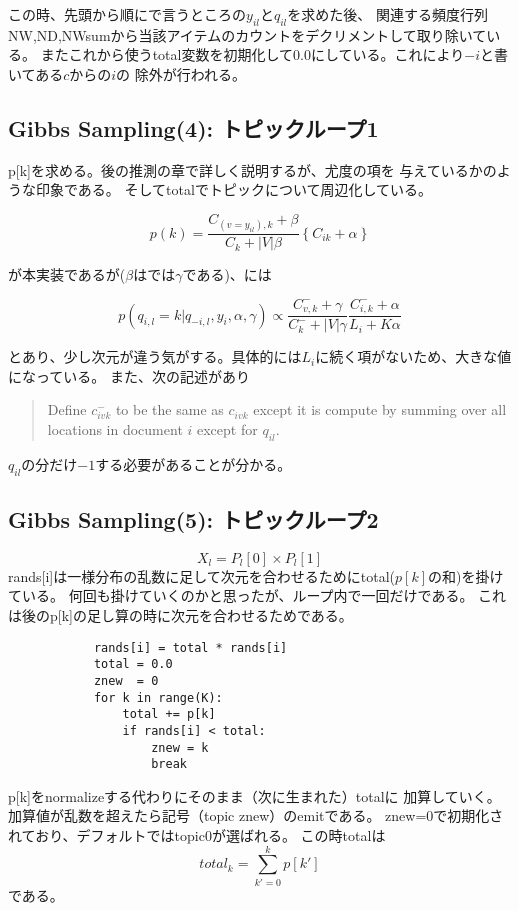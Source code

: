 \documentclass[uplatex]{jsarticle}
\begin{document}
この時、先頭から順に\cite{murphy}で言うところの$y_{il}$と$q_{il}$を求めた後、
関連する頻度行列NW,ND,NWsumから当該アイテムのカウントをデクリメントして取り除いている。
またこれから使うtotal変数を初期化して0.0にしている。これにより$-i$と書いてある$c$からの$i$の
除外が行われる。

\subsection{Gibbs Sampling(4): トピックループ1}
p[k]を求める。後の推測の章で詳しく説明するが、尤度の項を
与えているかのような印象である。
そしてtotalでトピックについて周辺化している。

\begin{equation}
p(k) = \frac{C_{(v=y_{il}),k} + \beta}{C_{k} + |V|\beta} \left\{C_{ik} + \alpha\right\}
\end{equation}

が本実装であるが($\beta$は\cite{murphy}では$\gamma$である)、\cite{murphy}には

\begin{equation}
p(q_{i,l} = k|q_{−i,l}, y_i, \alpha, \gamma) ∝ \frac{C_{v,k}^{-} + \gamma}{C_{k}^{-} + |V|\gamma} \frac{C_{i,k}^{-} + \alpha}{L_i + K\alpha}
\end{equation}

とあり、少し次元が違う気がする。具体的には$L_i$に続く項がないため、大きな値になっている。
また、次の記述があり

\begin{quote}
Define $c^{−}_{ivk}$ to be the same as $c_{ivk}$ except it is compute by summing over all locations in document $i$ except for $q_{il}$.\cite{murphy}
\end{quote}

$q_{il}$の分だけ$-1$する必要があることが分かる。 

\subsection{Gibbs Sampling(5): トピックループ2}
\begin{equation}
X_l = P_l[0] \times P_l[1]
\end{equation}
rands[i]は一様分布の乱数に足して次元を合わせるためにtotal($p[k]$の和)を掛けている。
何回も掛けていくのかと思ったが、ループ内で一回だけである。
これは後のp[k]の足し算の時に次元を合わせるためである。
\begin{lstlisting}
            rands[i] = total * rands[i]
            total = 0.0
            znew  = 0
            for k in range(K):
                total += p[k]
                if rands[i] < total:
                    znew = k
                    break
\end{lstlisting}
p[k]をnormalizeする代わりにそのまま（次に生まれた）totalに
加算していく。加算値が乱数を超えたら記号（topic znew）のemitである。
znew=0で初期化されており、デフォルトではtopic0が選ばれる。
この時totalは
\begin{equation}
total_k = \sum_{k'=0}^{k} p[k']
\end{equation}
である。
\end{document}
